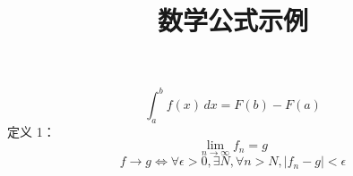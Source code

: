 \documentclass[UTF8]{ctexart}
\begin{document}
\title{数学公式示例}
\[
\int_a^b f(x) \, dx = F(b) - F(a)
\]
定义 1：
\[
\lim_{n \to \infty} f_n = g
\]
\[
f\to g \iff \forall \epsilon > 0, \exists N, \forall n > N, |f_n - g| < \epsilon
\]
\end{document}
